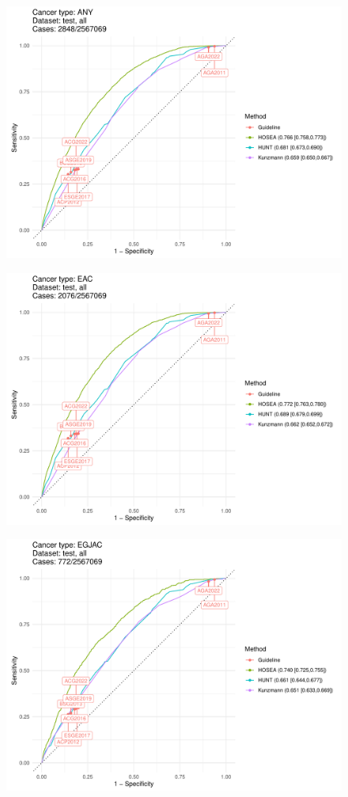 \documentclass[english]{article}
\begin{document}
\begin{figure}[ht]
\includegraphics[width=1.0\linewidth]{comparison/ANY_all.pdf}
\end{figure}
\begin{figure}[ht]
\includegraphics[width=1.0\linewidth]{comparison/EAC_all.pdf}
\end{figure}
\begin{figure}[ht]
\includegraphics[width=1.0\linewidth]{comparison/EGJAC_all.pdf}
\end{figure}
\end{document}
